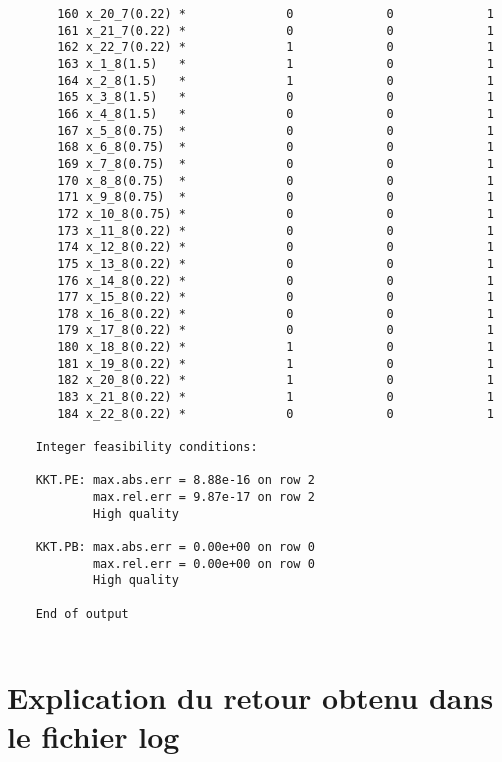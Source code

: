 \documentclass{article}[A4]
\begin{document}
\begin{verbatim}
	   160 x_20_7(0.22) *              0             0             1 
	   161 x_21_7(0.22) *              0             0             1 
	   162 x_22_7(0.22) *              1             0             1 
	   163 x_1_8(1.5)   *              1             0             1 
	   164 x_2_8(1.5)   *              1             0             1 
	   165 x_3_8(1.5)   *              0             0             1 
	   166 x_4_8(1.5)   *              0             0             1 
	   167 x_5_8(0.75)  *              0             0             1 
	   168 x_6_8(0.75)  *              0             0             1 
	   169 x_7_8(0.75)  *              0             0             1 
	   170 x_8_8(0.75)  *              0             0             1 
	   171 x_9_8(0.75)  *              0             0             1 
	   172 x_10_8(0.75) *              0             0             1 
	   173 x_11_8(0.22) *              0             0             1 
	   174 x_12_8(0.22) *              0             0             1 
	   175 x_13_8(0.22) *              0             0             1 
	   176 x_14_8(0.22) *              0             0             1 
	   177 x_15_8(0.22) *              0             0             1 
	   178 x_16_8(0.22) *              0             0             1 
	   179 x_17_8(0.22) *              0             0             1 
	   180 x_18_8(0.22) *              1             0             1 
	   181 x_19_8(0.22) *              1             0             1 
	   182 x_20_8(0.22) *              1             0             1 
	   183 x_21_8(0.22) *              1             0             1 
	   184 x_22_8(0.22) *              0             0             1 
	
	Integer feasibility conditions:
	
	KKT.PE: max.abs.err = 8.88e-16 on row 2
			max.rel.err = 9.87e-17 on row 2
			High quality
	
	KKT.PB: max.abs.err = 0.00e+00 on row 0
			max.rel.err = 0.00e+00 on row 0
			High quality
	
	End of output
	
\end{verbatim}
\section{Explication du retour obtenu dans le fichier log}
\end{document}
